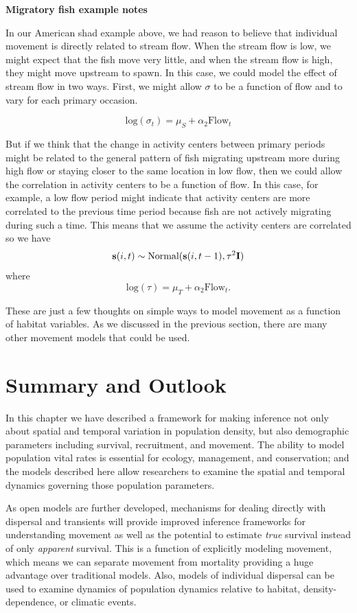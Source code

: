 {\bf Migratory fish example notes}

In our American shad example above, we had reason to believe
that individual movement is directly related to stream flow.  When the
stream flow is low,
we might expect that the fish move very little, and when the stream
flow is high, they might
move upstream to spawn. In this case,
we could model the effect of stream flow in two ways.  First, we might allow $\sigma$
to be a function of flow and to vary for each primary occasion.

\[
 \mbox{log}(\sigma_t) = \mu_S + \alpha_2 \mbox{Flow}_t
\]

But if we think that the change in activity centers between primary periods might be related to the 
general pattern of fish migrating upstream more during high flow or staying closer to the same location
in low flow, then we could allow the correlation in activity centers to be a function of flow.  In this
case, for example, a low flow period might indicate that activity centers are more correlated to the previous
time period because fish are not actively migrating during such a time.  
This means that we assume the
activity centers are correlated so we have
\[
{\bf s}(i,t) \sim \mbox{Normal}({\bf
  s}(i,t-1), \tau^{2} {\bf I})
\]
where
\[
\mbox{log}(\tau) = \mu_T + \alpha_2 \mbox{Flow}_t.
\]

These are just a few thoughts on simple ways to model movement as a
function of habitat variables. 
As we discussed in the previous section, there
are many other movement models that could be used.


\section{Summary and Outlook}

In this chapter we have described a framework for making inference not only about
spatial and temporal variation in population density, but also demographic
parameters including survival, recruitment, and movement. The ability to
model population vital rates is essential for ecology, management, and
conservation;
and the models described here allow researchers to examine the spatial
and temporal dynamics governing those population parameters.

As open models are further developed, mechanisms for dealing directly with
dispersal and transients will provide improved inference frameworks for
understanding movement as well as the potential to estimate {\it true} survival instead
of only {\it apparent} survival.
This is a function of explicitly modeling movement, which means we can
separate movement from mortality providing a huge advantage over traditional models.  Also,
models of individual dispersal can be used to examine dynamics of population dynamics relative
to habitat, density-dependence, or climatic events.

